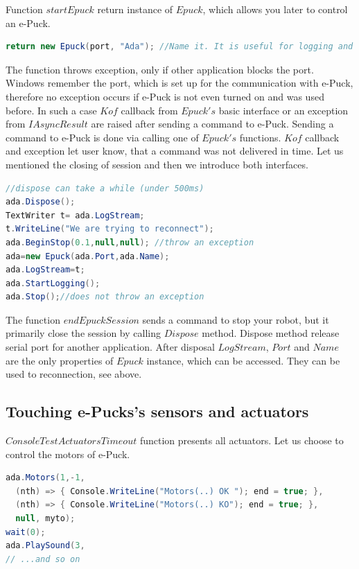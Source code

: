   Function $startEpuck$ return instance of $Epuck$, which allows you later to control an e-Puck.
\begin{lstlisting}[language=cs]
return new Epuck(port, "Ada"); //Name it. It is useful for logging and debugging.
\end{lstlisting}
  The function throws exception, only if other application blocks the port. Windows remember
  the port, which is set up for the communication with e-Puck, therefore
  no exception occurs if e-Puck is not even turned on and was used before.
  In such a case $Kof$ callback from $Epuck's$ basic interface or an exception	
  from $IAsyncResult$ are raised after sending a command to e-Puck.
  Sending a command to e-Puck is done via calling one of $Epuck's$ functions.
  $Kof$ callback and exception let user know, that a command was not delivered in time.
  Let us mentioned the closing of session and then we introduce both interfaces.
\begin{lstlisting}[language=cs]
//dispose can take a while (under 500ms)
ada.Dispose();
TextWriter t= ada.LogStream;
t.WriteLine("We are trying to reconnect");
ada.BeginStop(0.1,null,null); //throw an exception
ada=new Epuck(ada.Port,ada.Name);
ada.LogStream=t;
ada.StartLogging();
ada.Stop();//does not throw an exception
\end{lstlisting}
  The function $endEpuckSession$ sends a command to stop your robot, but it primarily close the session by calling $Dispose$ method.
  Dispose method release serial port for another application. After disposal $LogStream$, $Port$ and $Name$ are the 
  only properties of $Epuck$ instance, which can be accessed. They can be used to reconnection, see above.

\subsection{Touching e-Pucks's sensors and actuators}\label{sec:touching}
  $ConsoleTestActuatorsTimeout$ function presents all actuators. Let us choose to control the motors of e-Puck.
\begin{lstlisting}[language=cs]
ada.Motors(1,-1,
  (nth) => { Console.WriteLine("Motors(..) OK "); end = true; },
  (nth) => { Console.WriteLine("Motors(..) KO"); end = true; },
  null, myto);
wait(0);
ada.PlaySound(3,
// ...and so on
\end{lstlisting}
  
